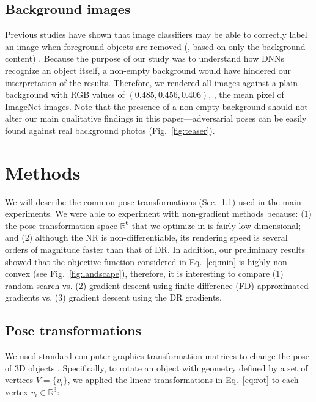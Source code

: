 \documentclass[10pt,twocolumn,letterpaper]{article}
\newcommand{\R}{\mathbb{R}}
\begin{document}
\subsection{Background images}

Previous studies have shown that image classifiers may be able to correctly label an image when foreground objects are removed (\ie, based on only the background content) \cite{zhu2016object}.
Because the purpose of our study was to understand how DNNs recognize an object itself, a non-empty background would have hindered our interpretation of the results.
Therefore, we rendered all images against a plain background with RGB values of $(0.485, 0.456, 0.406)$, \ie, the mean pixel of ImageNet images.
Note that the presence of a non-empty background should not alter our main qualitative findings in this paper---adversarial poses can be easily found against real background photos (Fig.~\ref{fig:teaser}).



\section{Methods}
\label{sec:methods}


We will describe the common pose transformations  (Sec.~\ref{sec:transformations}) used in the main experiments.
We were able to experiment with non-gradient methods because: (1) the pose transformation space $\R^6$ that we optimize in is fairly low-dimensional; and (2) although the NR is non-differentiable, its rendering speed is several orders of magnitude faster than that of DR.
In addition, our preliminary results showed that the objective function considered in Eq.~\ref{eq:min} is highly non-convex (see Fig.~\ref{fig:landscape}), therefore, it is interesting to compare (1) random search vs. (2) gradient descent using finite-difference (FD) approximated gradients vs. (3) gradient descent using the DR gradients.

\subsection{Pose transformations}
\label{sec:transformations}

We used standard computer graphics transformation matrices to change the pose of 3D objects \cite{marschner2015fundamentals}.
Specifically, to rotate an object with geometry defined by a set of vertices $V = \{v_i\}$, we applied the linear transformations in Eq.~\ref{eq:rot} to each vertex $v_{i} \in \R^3$:
\end{document}
